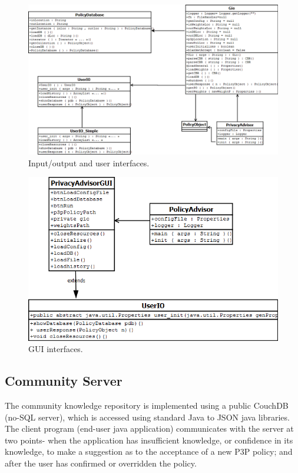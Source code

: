 \begin{figure}[htbp]
\begin{center}
\includegraphics[width = \textwidth]{DesignReport/uml/gio.png}
\caption{Input/output and user interfaces.}
\label{UserIO}
\end{center}
\end{figure}


\begin{figure}[htbp]
\begin{center}
\includegraphics[width = \textwidth]{DesignReport/uml/policyadvisorgui}
\caption{GUI interfaces.}
\label{GUI_interface}
\end{center}
\end{figure}



\subsection{Community Server} %
The community knowledge repository is implemented using a public CouchDB (no-SQL server), which is accessed using standard Java to JSON java libraries. The client program (end-user java application) communicates with the server at two points- when the application has insufficient knowledge, or confidence in its knowledge, to make a suggestion as to the acceptance of a new P3P policy; and after the user has confirmed or overridden the policy.

